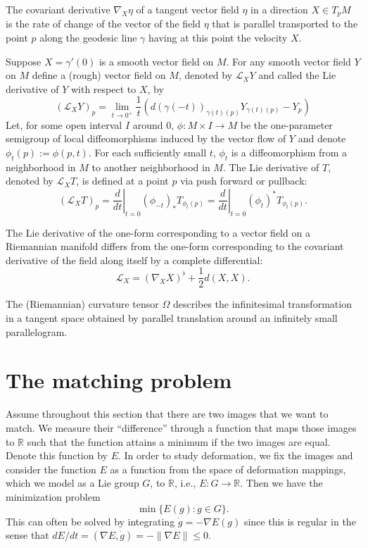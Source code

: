 \documentclass{article}
\theoremstyle{plain}
\theoremstyle{definition}
\newcommand{\R}{\ensuremath{\mathbb{R}}}
\newcommand{\lie}{\ensuremath{\mathcal{L}}}
\begin{document}
The covariant derivative $\nabla_X\eta$ of a tangent vector field $\eta$ in a
direction $X\in T_pM$ is the rate of change of the vector of the field $\eta$ that is parallel transported to the point $p$ along the geodesic line $\gamma$ having at this point the velocity $X$.

Suppose $X=\gamma'(0)$ is a smooth vector field on $M$. %
For any smooth vector field $Y$ on $M$ define a (rough) vector field on $M$, denoted by $\lie_XY$ and called the Lie derivative of $Y$ with respect to $X$, by
\[
(\lie_XY)_p = \lim_{t\to 0^+}\frac{1}{t}\left(d(\gamma(-t))_{\gamma(t)(p)}Y_{\gamma(t)(p)}-Y_p\right)
\]
Let, for some open interval $I$ around $0$, $\phi : M \times I \to M$ be the one-parameter semigroup of local diffeomorphisms induced by the vector flow of $Y$ and denote $\phi_t(p) := \phi(p, t)$. For each sufficiently small $t$, $\phi_t$ is a diffeomorphism from a neighborhood in $M$ to another neighborhood in $M$. The Lie derivative of $T$, denoted by $\lie_XT$, is defined at a point $p$ via push forward or pullback: 
\[
(\lie_XT)_p = \left.\frac{d}{dt}\right|_{t=0} (\phi_{-t})_*T_{\phi_t(p)}=\left.\frac{d}{dt}\right|_{t=0} (\phi_{t})^*T_{\phi_t(p)}.
\]

The Lie derivative of the one-form corresponding to a vector
field on a Riemannian manifold differs from the one-form corresponding to the
covariant derivative of the field along itself by a complete differential:
\[
\lie_X=(\nabla_X X)^\flat +\frac{1}{2}d(X,X).
\]

The (Riemannian) curvature tensor $\Omega$ describes the infinitesimal
transformation in a tangent space obtained by parallel translation around an
infinitely small parallelogram.







\section{The matching problem}
Assume throughout this section that there are two images that we want to match. We measure their ``difference'' through a function that maps those images to $\R$ such that the function attains a minimum if the two images are equal. Denote this function by $E$. In order to study deformation, we fix the images and consider the function $E$ as a function from the space of deformation mappings, which we model as a Lie group $G$, to $\R$, i.e., $E:G\to \R$. Then we have the minimization problem
\[
\min \{E(g):g\in G\}.
\]
This can often be solved by integrating $\dot{g}=-\nabla E(g)$ since this is regular in the sense that $dE/dt=(\nabla E,\dot{g})=-\|\nabla E\|\leq 0$.
\end{document}
